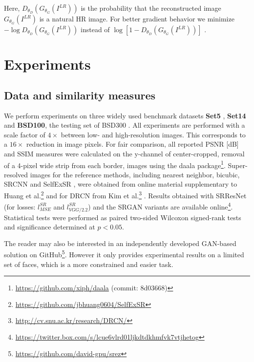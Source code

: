 \documentclass[10pt,twocolumn,letterpaper]{article}
\begin{document}
Here, $D_{\theta_D}(G_{\theta_G}(I^{LR}))$ is the probability that the
reconstructed image $G_{\theta_G}(I^{LR})$ is a natural HR image. For better gradient behavior we minimize $-\log D_{\theta_D}(G_{\theta_G}(I^{LR}))$ instead of $\log [1-D_{\theta_D}(G_{\theta_G}(I^{LR}))]$ \cite{Goodfellow14GAN}.

%
\section{Experiments}
\label{sec:experiments}
\subsection{Data and similarity measures}
\label{subsec:data}
We perform experiments on three widely used benchmark datasets \textbf{Set5} \cite{bevilacqua2012low}, \textbf{Set14} \cite{zeyde2012single} and \textbf{BSD100}, the testing set of BSD300 \cite{MartinFTM01}. All experiments are performed with a scale factor of $4\times$ between low- and high-resolution images. This corresponds to a $16\times$ reduction in image pixels. For fair  comparison, all reported \ac{PSNR} [dB] and \ac{SSIM} \cite{Wang2004} measures were calculated on the y-channel of center-cropped, removal of a 4-pixel wide strip from each border, images using the daala package\footnote{\url{https://github.com/xiph/daala} (commit: 8d03668)}. Super-resolved images for the reference methods, including nearest neighbor, bicubic, SRCNN \cite{dong2014learning} and SelfExSR \cite{Huang15selfexemplars}, were obtained from online material supplementary to Huang et al.\footnote{\url{https://github.com/jbhuang0604/SelfExSR}} \cite{Huang15selfexemplars} and for DRCN from Kim et al.\footnote{\url{http://cv.snu.ac.kr/research/DRCN/}} \cite{kim2016deeply}.	
	Results obtained with SRResNet (for losses: $l^{SR}_{MSE}$ and $l^{SR}_{VGG/2.2}$) and the SRGAN variants are available online\footnote{\url{https://twitter.box.com/s/lcue6vlrd01ljkdtdkhmfvk7vtjhetog}}.
	Statistical tests were performed as paired two-sided Wilcoxon signed-rank tests and significance determined at $p<0.05$.
	
	The reader may also be interested in an independently developed GAN-based solution on GitHub\footnote{\url{https://github.com/david-gpu/srez}}. However it only provides experimental results on a limited set of faces, which is a more constrained and easier task.
\end{document}
